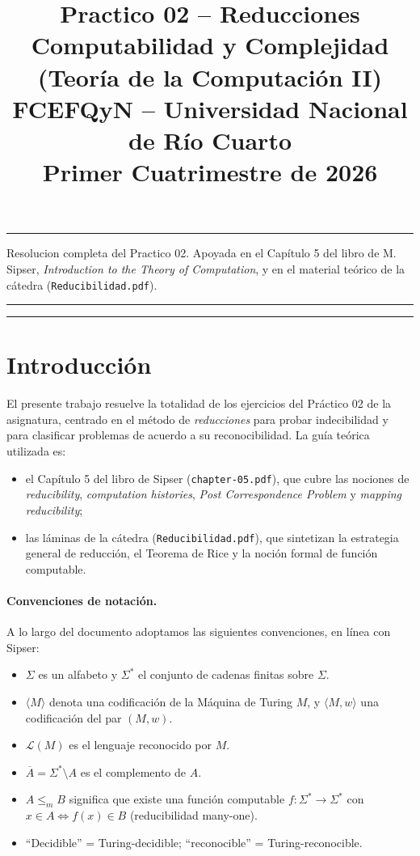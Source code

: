 \documentclass[11pt,a4paper]{article}
\title{\textbf{Practico 02 -- Reducciones}\\[0.3em]
       \normalsize Computabilidad y Complejidad (Teor\'ia de la Computaci\'on II)\\
       \normalsize FCEFQyN -- Universidad Nacional de R\'io Cuarto\\
       \normalsize Primer Cuatrimestre de 2026}
\author{}
\date{}
\theoremstyle{plain}
\theoremstyle{definition}
\theoremstyle{remark}
\newcommand{\enc}[1]{\langle #1\rangle}
\newcommand{\encMw}{\langle M, w\rangle}
\newcommand{\lang}{\mathcal{L}}
\newcommand{\Sstar}{\Sigma^{*}}
\newcommand{\redm}{\le_{m}}
\newcommand{\compl}[1]{\overline{#1}}
\begin{document}
\maketitle
\thispagestyle{empty}

\hrule
\vspace{0.4em}
\begin{center}
\small
Resolucion completa del Practico 02. Apoyada en el Cap\'itulo 5 del libro de
M. Sipser, \emph{Introduction to the Theory of Computation}, y en el material
te\'orico de la c\'atedra (\texttt{Reducibilidad.pdf}).
\end{center}
\vspace{0.4em}
\hrule

\tableofcontents
\bigskip
\hrule
\bigskip

\section*{Introducci\'on}

El presente trabajo resuelve la totalidad de los ejercicios del Pr\'actico 02
de la asignatura, centrado en el m\'etodo de \emph{reducciones} para probar
indecibilidad y para clasificar problemas de acuerdo a su reconocibilidad.
La gu\'ia te\'orica utilizada es:

\begin{itemize}
  \item el Cap\'itulo 5 del libro de Sipser (\texttt{chapter-05.pdf}), que cubre
        las nociones de \emph{reducibility}, \emph{computation histories},
        \emph{Post Correspondence Problem} y \emph{mapping reducibility};
  \item las l\'aminas de la c\'atedra (\texttt{Reducibilidad.pdf}), que
        sintetizan la estrategia general de reducci\'on, el Teorema de Rice
        y la noci\'on formal de funci\'on computable.
\end{itemize}

\paragraph{Convenciones de notaci\'on.}
A lo largo del documento adoptamos las siguientes convenciones, en l\'inea
con Sipser:
\begin{itemize}
  \item $\Sigma$ es un alfabeto y $\Sstar$ el conjunto de cadenas finitas
        sobre $\Sigma$.
  \item $\enc{M}$ denota una codificaci\'on de la M\'aquina de Turing $M$,
        y $\encMw$ una codificaci\'on del par $(M,w)$.
  \item $\lang(M)$ es el lenguaje reconocido por $M$.
  \item $\compl{A} = \Sstar \setminus A$ es el complemento de $A$.
  \item $A \redm B$ significa que existe una funci\'on computable $f:\Sstar\to\Sstar$
        con $x\in A \iff f(x)\in B$ (reducibilidad many-one).
  \item ``Decidible'' = Turing-decidible; ``reconocible'' = Turing-reconocible.
\end{itemize}
\end{document}
